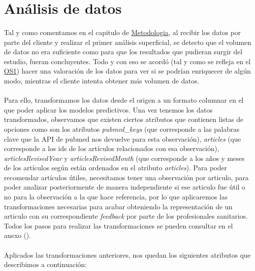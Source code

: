 \section{Análisis de datos}
\label{section:analisis_datos}

\paragraph{}
Tal y como comentamos en el capitulo de \hyperref[chapter:metodologia]{Metodologia}, al recibir los datos por parte del cliente y realizar el primer análisis superficial, se detecto que el volumen de datos no era suficiente como para que los resultados que pudieran surgir del estudio, fueran concluyentes. Todo y con eso se acordó (tal y como se refleja en el \hyperref[os:OS1]{OS1}) hacer una valoración de los datos para ver si se podrían enriquecer de algún modo, mientras el cliente intenta obtener más volumen de datos.

\paragraph{}
Para ello, transformamos los datos desde el origen a un formato columnar en el que poder aplicar los modelos predictivos. Una vez tenemos los datos transformados, observamos que existen ciertos atributos que contienen listas de opciones como son los atributos \textit{pubmed\_keys} (que corresponde a las palabras clave que la API\cite{ref:pubmed_api} de pubmed nos devuelve para esta observación), \textit{articles} (que corresponde a los ids de los artículos relacionados con esa observación), \textit{articlesRevisedYear} y \textit{articlesRevisedMonth} (que corresponde a los años y meses de los artículos según están ordenados en el atributo \textit{articles}). Para poder recomendar artículos útiles, necesitamos tener una observación por articulo, para poder analizar posteriormente de manera independiente si ese articulo fue útil o no para la observación a la que hace referencia, por lo que aplicaremos las transformaciones necesarias para acabar obteniendo la representación de un articulo con su correspondiente \textit{feedback} por parte de los profesionales sanitarios. Todos los pasos para realizar las transformaciones se pueden consultar en el anexo ().

\paragraph{}
Aplicados las transformaciones anteriores, nos quedan los siguientes atributos que describimos a continuación:

